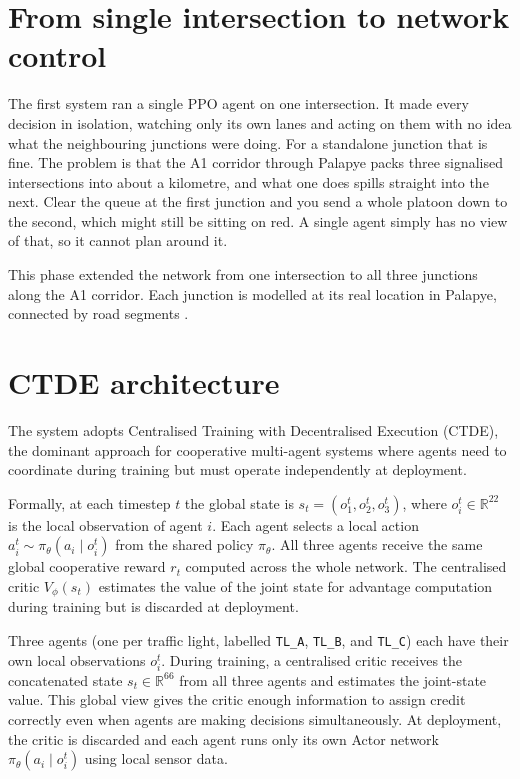 ﻿\documentclass[11pt, a4paper]{report}
\begin{document}
\section{From single intersection to network control}

The first system ran a single PPO agent on one intersection. It made every decision in isolation, watching only its own lanes and acting on them with no idea what the neighbouring junctions were doing. For a standalone junction that is fine. The problem is that the A1 corridor through Palapye packs three signalised intersections into about a kilometre, and what one does spills straight into the next. Clear the queue at the first junction and you send a whole platoon down to the second, which might still be sitting on red. A single agent simply has no view of that, so it cannot plan around it.


This phase extended the network from one intersection to all three junctions along the A1 corridor. Each junction is modelled at its real location in Palapye, connected by road segments .

\section{CTDE architecture}

The system adopts Centralised Training with Decentralised Execution (CTDE), the dominant approach for cooperative multi-agent systems where agents need to coordinate during training but must operate independently at deployment.

Formally, at each timestep $t$ the global state is $s_t = (o_1^t, o_2^t, o_3^t)$, where $o_i^t \in \mathbb{R}^{22}$ is the local observation of agent $i$. Each agent selects a local action $a_i^t \sim \pi_\theta(a_i \mid o_i^t)$ from the shared policy $\pi_\theta$. All three agents receive the same global cooperative reward $r_t$ computed across the whole network. The centralised critic $V_\phi(s_t)$ estimates the value of the joint state for advantage computation during training but is discarded at deployment.

Three agents (one per traffic light, labelled \texttt{TL\_A}, \texttt{TL\_B}, and \texttt{TL\_C}) each have their own local observations $o_i^t$. During training, a centralised critic receives the concatenated state $s_t \in \mathbb{R}^{66}$ from all three agents and estimates the joint-state value. This global view gives the critic enough information to assign credit correctly even when agents are making decisions simultaneously. At deployment, the critic is discarded and each agent runs only its own Actor network $\pi_\theta(a_i \mid o_i^t)$ using local sensor data.
\end{document}
